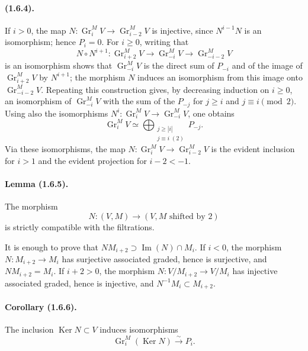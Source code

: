 \documentclass[11pt]{article}
\theoremstyle{remark}
\newcommand{\Gr}{\operatorname{Gr}}
\newcommand{\Ker}{\operatorname{Ker}}
\begin{document}
\paragraph{(1.6.4).} If $i>0$, the map $N:\Gr^M_iV\to\Gr^M_{i-2}V$ is injective, since $N^{i-1}N$ is an isomorphism; hence $P_i=0$. For $i\ge0$, writing that
\[
N\circ N^{i+1}:\Gr^M_{i+2}V\longrightarrow \Gr^M_{-i}V\longrightarrow \Gr^M_{-i-2}V
\]
is an isomorphism shows that $\Gr^M_{-i}V$ is the direct sum of $P_{-i}$ and of the image of $\Gr^M_{i+2}V$ by $N^{i+1}$; the morphism $N$ induces an isomorphism from this image onto $\Gr^M_{-i-2}V$. Repeating this construction gives, by decreasing induction on $i\ge0$, an isomorphism of $\Gr^M_{-i}V$ with the sum of the $P_{-j}$ for $j\ge i$ and $j\equiv i\pmod 2$. Using also the isomorphisms $N^i:\Gr^M_iV\to\Gr^M_{-i}V$, one obtains
\begin{equation}\tag{1.6.4.1}
        \Gr^M_iV\simeq \bigoplus_{\substack{j\ge |i|\\ j\equiv i\; (2)}} P_{-j}.
\end{equation}
Via these isomorphisms, the map $N:\Gr^M_iV\to\Gr^M_{i-2}V$ is the evident inclusion for $i>1$ and the evident projection for $i-2<-1$.

\paragraph{Lemma (1.6.5).} The morphism
\[
        N:(V,M)\longrightarrow (V,M\text{ shifted by }2)
\]
is strictly compatible with the filtrations.

It is enough to prove that $NM_{i+2}\supset \operatorname{Im}(N)\cap M_i$. If $i<0$, the morphism $N:M_{i+2}\to M_i$ has surjective associated graded, hence is surjective, and $NM_{i+2}=M_i$. If $i+2>0$, the morphism $N:V/M_{i+2}\to V/M_i$ has injective associated graded, hence is injective, and $N^{-1}M_i\subset M_{i+2}$.

\paragraph{Corollary (1.6.6).} The inclusion $\Ker N\subset V$ induces isomorphisms
\[
        \Gr^M_i(\Ker N) \xrightarrow{\sim} P_i.
\]
\end{document}
